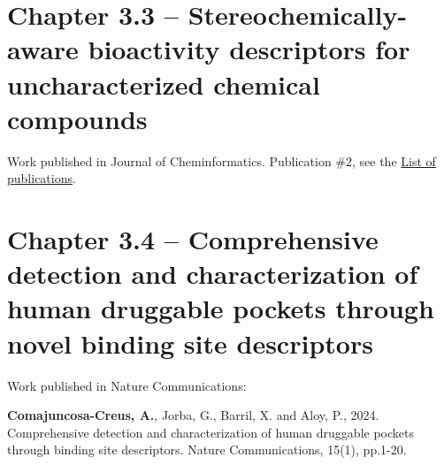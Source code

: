 \section[Stereochemically-aware bioactivity descriptors for uncharacterized chemical compounds]{Chapter 3.3 -- Stereochemically-aware bioactivity descriptors for uncharacterized chemical compounds}
\setcounter{figure}{0}
\renewcommand{\thefigure}{3.\arabic{section}.\arabic{figure}}
\hspace*{\fill} Work published in Journal of Cheminformatics. \newline
\hspace*{\fill} Publication \#2, see the \hyperref[ListOfPublications]{List of publications}.






\newpage




\section[Comprehensive detection and characterization of human druggable pockets through novel binding site descriptors]{Chapter 3.4 -- Comprehensive detection and characterization of human druggable pockets through novel binding site descriptors}
\setcounter{figure}{0}
\renewcommand{\thefigure}{3.\arabic{section}.\arabic{figure}}
Work published in Nature Communications:

\textbf{Comajuncosa-Creus, A.}, Jorba, G., Barril, X. and Aloy, P., 2024. Comprehensive detection and characterization of human druggable pockets through binding site descriptors. Nature Communications, 15(1), pp.1-20. \newline








\newpage